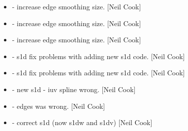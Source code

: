 \documentclass[a4paper,10pt,english]{report}
\begin{document}
\begin{itemize}
\item {} 
 - increase edge smoothing size. {[}Neil Cook{]}

\item {} 
 - increase edge smoothing size. {[}Neil Cook{]}

\item {} 
 - increase edge smoothing size. {[}Neil Cook{]}

\item {} 
 - s1d fix problems with adding new s1d code.
{[}Neil Cook{]}

\item {} 
 - s1d fix problems with adding new s1d code.
{[}Neil Cook{]}

\item {} 
 - new s1d - iuv spline wrong. {[}Neil Cook{]}

\item {} 
 - edges was wrong. {[}Neil Cook{]}

\item {} 
 - correct s1d (now s1dw and s1dv) {[}Neil
Cook{]}

\end{itemize}
\end{document}
